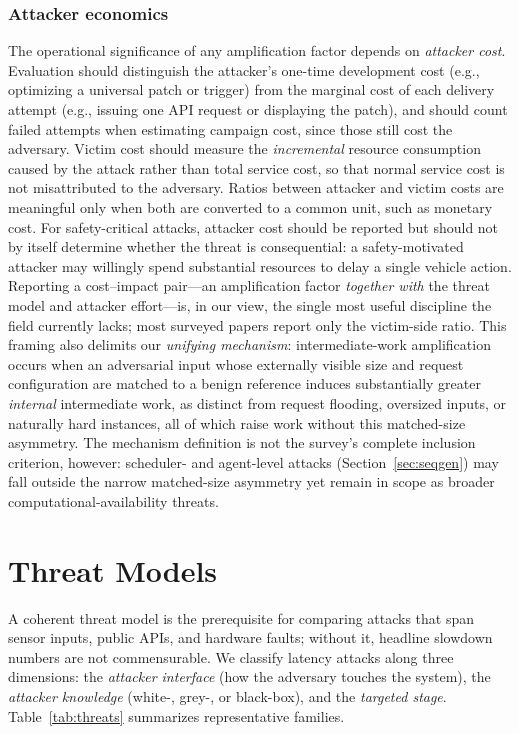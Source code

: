 \documentclass[acmsmall,screen,review,nonacm]{acmart}
\begin{document}
\subsubsection{Attacker economics}
The operational significance of any amplification factor depends on \emph{attacker cost}. Evaluation should distinguish the attacker's one-time development cost (e.g., optimizing a universal patch or trigger) from the marginal cost of each delivery attempt (e.g., issuing one API request or displaying the patch), and should count failed attempts when estimating campaign cost, since those still cost the adversary. Victim cost should measure the \emph{incremental} resource consumption caused by the attack rather than total service cost, so that normal service cost is not misattributed to the adversary. Ratios between attacker and victim costs are meaningful only when both are converted to a common unit, such as monetary cost. For safety-critical attacks, attacker cost should be reported but should not by itself determine whether the threat is consequential: a safety-motivated attacker may willingly spend substantial resources to delay a single vehicle action. Reporting a cost--impact pair---an amplification factor \emph{together with} the threat model and attacker effort---is, in our view, the single most useful discipline the field currently lacks; most surveyed papers report only the victim-side ratio. This framing also delimits our \emph{unifying mechanism}: intermediate-work amplification occurs when an adversarial input whose externally visible size and request configuration are matched to a benign reference induces substantially greater \emph{internal} intermediate work, as distinct from request flooding, oversized inputs, or naturally hard instances, all of which raise work without this matched-size asymmetry. The mechanism definition is not the survey's complete inclusion criterion, however: scheduler- and agent-level attacks (Section~\ref{sec:seqgen}) may fall outside the narrow matched-size asymmetry yet remain in scope as broader computational-availability threats.

\section{Threat Models}
\label{sec:threat}
A coherent threat model is the prerequisite for comparing attacks that span sensor inputs, public APIs, and hardware faults; without it, headline slowdown numbers are not commensurable. We classify latency attacks along three dimensions: the \emph{attacker interface} (how the adversary touches the system), the \emph{attacker knowledge} (white-, grey-, or black-box), and the \emph{targeted stage}. Table~\ref{tab:threats} summarizes representative families.
\end{document}
